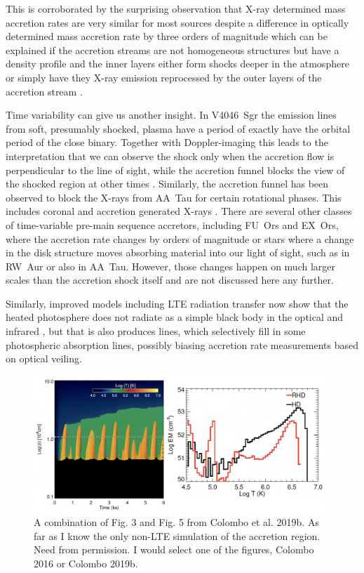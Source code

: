 This is corroborated by the surprising observation that X-ray determined mass accretion rates are very similar for most sources despite a difference in optically determined mass accretion rate by three orders of magnitude \cite{2011A&A...526A.104C} which can be explained if the accretion streams are not homogeneous structures but have a density profile and the inner layers either form shocks deeper in the atmosphere or simply have they X-ray emission reprocessed by the outer layers of the accretion stream \cite{2018A&A...618A..55S,2021Natur.597...41E}.

Time variability can give us another insight. In V4046~Sgr the emission lines from soft, presumably shocked, plasma have a period of exactly have the orbital period of the close binary. Together with Doppler-imaging this leads to the interpretation that we can observe the shock only when the accretion flow is perpendicular to the line of sight, while the accretion funnel blocks the view of the shocked region at other times \cite{2012ApJ...752..100A}. Similarly, the accretion funnel has been observed to block the X-rays from AA~Tau for certain rotational phases. This includes coronal and accretion generated X-rays \cite{2007A&A...462L..41S,2007A&A...475..607G}.
There are several other classes of time-variable pre-main sequence accretors, including FU~Ors and EX~Ors, where the accretion rate changes by orders of magnitude or stars where a change in the disk structure moves absorbing material into our light of sight, such as in RW~Aur or also in AA~Tau. However, those changes happen on much larger scales than the accretion shock itself and are not discussed here any further.

Similarly, improved models including LTE radiation transfer now show that the heated photosphere does not radiate as a simple black body in the optical and infrared \cite{Dodin_2012,Dodin_2013}, but that is also produces lines, which selectively fill in some photospheric absorption lines, possibly biasing accretion rate measurements based on optical veiling.



\begin{figure}
    \centering
    \includegraphics[width=11cm]{figs/colombo2019b.png}
    \caption{A combination of Fig. 3 and Fig. 5 from Colombo et al. 2019b. As far as I know the only non-LTE simulation of the accretion region. Need from permission. I would select one of the figures, Colombo 2016 or Colombo 2019b.}
    \label{fig:colombo2016}
\end{figure}

